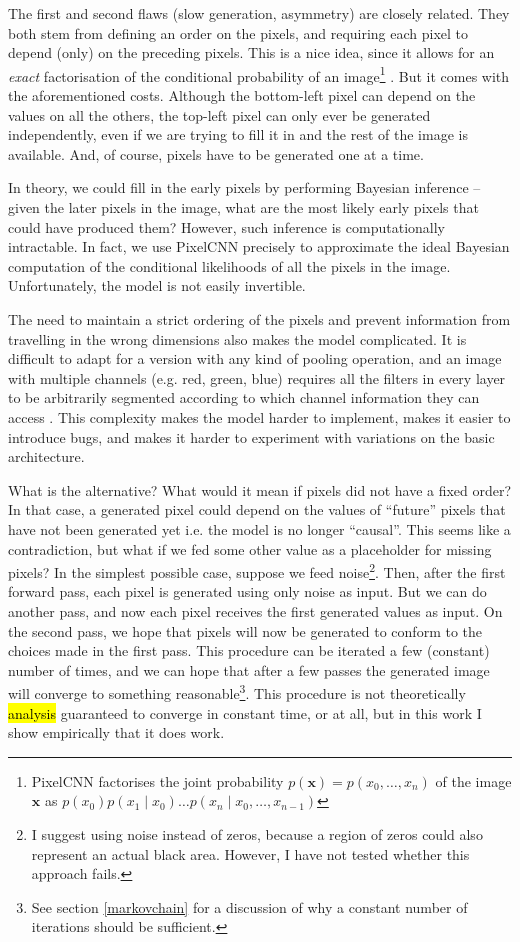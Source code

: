 \documentclass[11pt, a4paper]{book}
\newcommand{\vect}[1]{\mathbf{#1}}
\newcommand{\nquote}[1]{``{#1}''}
\begin{document}
The first and second flaws (slow generation, asymmetry) are closely related. They both stem from defining an order on the pixels, and requiring each pixel to depend (only) on the preceding pixels. This is a nice idea, since it allows for an \emph{exact} factorisation of the conditional probability of an image\footnote{PixelCNN factorises the joint probability $p(\vect{x})=p(x_0,\dots,x_n)$ of the image $\vect{x}$ as $p(x_0)p(x_1\mid x_0)\dots p(x_n\mid x_0,\dots,x_{n-1})$} \citep{pixelcnn1}. But it comes with the aforementioned costs. Although the bottom-left pixel can depend on the values on all the others, the top-left pixel can only ever be generated independently, even if we are trying to fill it in and the rest of the image is available. And, of course, pixels have to be generated one at a time.

In theory, we could fill in the early pixels by performing Bayesian inference -- given the later pixels in the image, what are the most likely early pixels that could have produced them? However, such inference is computationally intractable. In fact, we use PixelCNN precisely to approximate the ideal Bayesian computation of the conditional likelihoods of all the pixels in the image. Unfortunately, the model is not easily invertible.

The need to maintain a strict ordering of the pixels and prevent information from travelling in the wrong dimensions also makes the model complicated. It is difficult to adapt for a version with any kind of pooling operation, and an image with multiple channels (e.g. red, green, blue) requires all the filters in every layer to be arbitrarily segmented according to which channel information they can access \citep{pixelcnn2}. This complexity makes the model harder to implement, makes it easier to introduce bugs, and makes it harder to experiment with variations on the basic architecture.

What is the alternative? What would it mean if pixels did not have a fixed order? In that case, a generated pixel could depend on the values of \nquote{future} pixels that have not been generated yet i.e. the model is no longer \nquote{causal}. This seems like a contradiction, but what if we fed some other value as a placeholder for missing pixels? In the simplest possible case, suppose we feed noise\footnote{I suggest using noise instead of zeros, because a region of zeros could also represent an actual black area. However, I have not tested whether this approach fails.}. Then, after the first forward pass, each pixel is generated using only noise as input. But we can do another pass, and now each pixel receives the first generated values as input. On the second pass, we hope that pixels will now be generated to conform to the choices made in the first pass. This procedure can be iterated a few (constant) number of times, and we can hope that after a few passes the generated image will converge to something reasonable\footnote{See section \ref{markovchain} for a discussion of why a constant number of iterations should be sufficient.}. This procedure is not theoretically \hl{analysis} guaranteed to converge in constant time, or at all, but in this work I show empirically that it does work.
\end{document}
